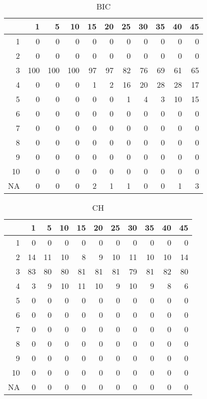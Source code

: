 \documentclass[11pt]{article}
\begin{document}
\begin{table}[H]
\centering
\begin{tabular}{rrrrrrrrrrr}
  \hline
 & 1 & 5 & 10 & 15 & 20 & 25 & 30 & 35 & 40 & 45 \\ 
  \hline
1 & 0 & 0 & 0 & 0 & 0 & 0 & 0 & 0 & 0 & 0 \\ 
  2 & 0 & 0 & 0 & 0 & 0 & 0 & 0 & 0 & 0 & 0 \\ 
  3 & 100 & 100 & 100 & 97 & 97 & 82 & 76 & 69 & 61 & 65 \\ 
  4 & 0 & 0 & 0 & 1 & 2 & 16 & 20 & 28 & 28 & 17 \\ 
  5 & 0 & 0 & 0 & 0 & 0 & 1 & 4 & 3 & 10 & 15 \\ 
  6 & 0 & 0 & 0 & 0 & 0 & 0 & 0 & 0 & 0 & 0 \\ 
  7 & 0 & 0 & 0 & 0 & 0 & 0 & 0 & 0 & 0 & 0 \\ 
  8 & 0 & 0 & 0 & 0 & 0 & 0 & 0 & 0 & 0 & 0 \\ 
  9 & 0 & 0 & 0 & 0 & 0 & 0 & 0 & 0 & 0 & 0 \\ 
  10 & 0 & 0 & 0 & 0 & 0 & 0 & 0 & 0 & 0 & 0 \\ 
  NA & 0 & 0 & 0 & 2 & 1 & 1 & 0 & 0 & 1 & 3 \\ 
   \hline
\end{tabular}
\caption{BIC} 
\end{table}
\begin{table}[H]
\centering
\begin{tabular}{rrrrrrrrrrr}
  \hline
 & 1 & 5 & 10 & 15 & 20 & 25 & 30 & 35 & 40 & 45 \\ 
  \hline
1 & 0 & 0 & 0 & 0 & 0 & 0 & 0 & 0 & 0 & 0 \\ 
  2 & 14 & 11 & 10 & 8 & 9 & 10 & 11 & 10 & 10 & 14 \\ 
  3 & 83 & 80 & 80 & 81 & 81 & 81 & 79 & 81 & 82 & 80 \\ 
  4 & 3 & 9 & 10 & 11 & 10 & 9 & 10 & 9 & 8 & 6 \\ 
  5 & 0 & 0 & 0 & 0 & 0 & 0 & 0 & 0 & 0 & 0 \\ 
  6 & 0 & 0 & 0 & 0 & 0 & 0 & 0 & 0 & 0 & 0 \\ 
  7 & 0 & 0 & 0 & 0 & 0 & 0 & 0 & 0 & 0 & 0 \\ 
  8 & 0 & 0 & 0 & 0 & 0 & 0 & 0 & 0 & 0 & 0 \\ 
  9 & 0 & 0 & 0 & 0 & 0 & 0 & 0 & 0 & 0 & 0 \\ 
  10 & 0 & 0 & 0 & 0 & 0 & 0 & 0 & 0 & 0 & 0 \\ 
  NA & 0 & 0 & 0 & 0 & 0 & 0 & 0 & 0 & 0 & 0 \\ 
   \hline
\end{tabular}
\caption{CH} 
\end{table}
\end{document}
